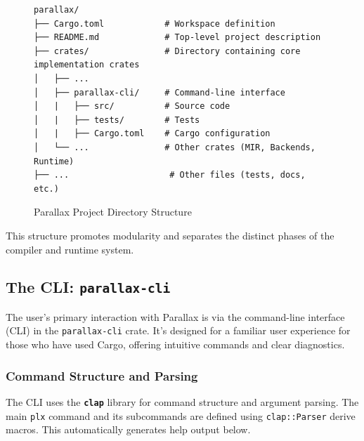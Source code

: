 \begin{figure}[h!]
    \centering
\begin{verbatim}
parallax/
├── Cargo.toml            # Workspace definition
├── README.md             # Top-level project description
├── crates/               # Directory containing core implementation crates
│   ├── ...
│   ├── parallax-cli/     # Command-line interface
│   |   ├── src/          # Source code
│   |   ├── tests/        # Tests
│   |   ├── Cargo.toml    # Cargo configuration
│   └── ...               # Other crates (MIR, Backends, Runtime)
├── ...                    # Other files (tests, docs, etc.)
\end{verbatim}
    \caption{Parallax Project Directory Structure}
    \label{fig:impl_dir_structure}
\end{figure}

This structure promotes modularity and separates the distinct phases of the compiler and runtime system.

\subsection{The CLI: \texttt{parallax-cli}}

The user's primary interaction with Parallax is via the command-line interface (CLI) in the \texttt{parallax-cli} crate. It's designed for a familiar user experience for those who have used Cargo, offering intuitive commands and clear diagnostics.

\subsubsection{Command Structure and Parsing}

The CLI uses the \textbf{\texttt{clap}} library \cite{Clap} for command structure and argument parsing. The main \texttt{plx} command and its subcommands are defined using \texttt{clap::Parser} derive macros. This automatically generates help output below.

